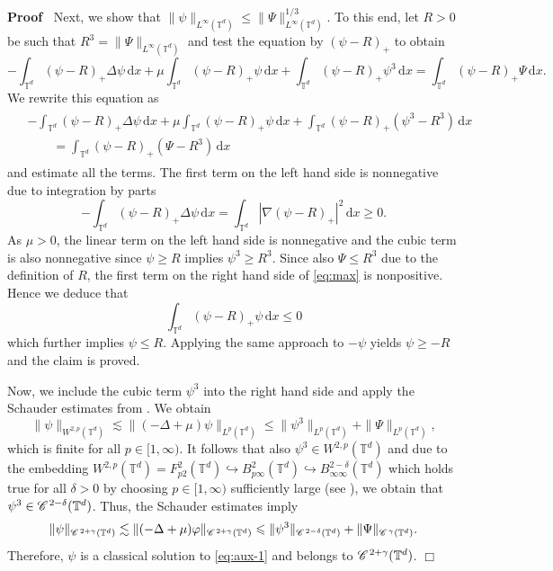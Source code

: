 \documentclass[a4paper,11pt]{article}
\renewcommand{\geq}{\geqslant}
\newenvironment{proof}{\noindent\textbf{Proof\ }}{\hspace*{\fill}$\Box$\medskip}
\numberwithin{equation}{section}
\newcommand{\CC}{\mathscr{C} \hspace{.1em}}
\newcommand{\8}{\infty}
\newcommand{\dd}{\mathrm{d}}
\begin{document}
\begin{proof}
Next, we show that  $\|\psi\|_{L^{\infty}(\mathbb{T}^{d})}\leqslant \|\Psi\|^{1/3}_{L^{\infty}(\mathbb{T}^{d})}$. To this end, let $R>0$ be such that $R^{3}=\| \Psi \|_{L^{\infty}(\mathbb{T}^{d})}$ and test the equation by $(\psi-R)_{+}$ to obtain
$$
- \int_{\mathbb{T}^{d}} (\psi-{R})_{+} \Delta\psi \,\dd x+ \mu\int_{\mathbb{T}^{d}} (\psi-R)_{+}\psi \,\dd x +\int_{\mathbb{T}^{d}} (\psi-R)_{+}\psi^{3}\,\dd x=\int_{\mathbb{T}^{d}} (\psi-R)_{+}\Psi\,\dd x.
$$
We rewrite this equation as
\begin{align}\label{eq:max}
\begin{aligned}
&- \int_{\mathbb{T}^{d}} (\psi-{R})_{+} \Delta\psi \,\dd x+ \mu\int_{\mathbb{T}^{d}} (\psi-R)_{+}\psi\,\dd x +\int_{\mathbb{T}^{d}} (\psi-R)_{+}(\psi^{3}-R^{3})\,\dd x\\
&\qquad =\int_{\mathbb{T}^{d}} (\psi-R)_{+}(\Psi -R^{3})\,\dd x
\end{aligned}
\end{align}
and estimate all the terms. The first term on the left hand side is nonnegative due to integration by parts
$$
- \int_{\mathbb{T}^{d}} (\psi-{R})_{+} \Delta\psi\,\dd x=\int_{\mathbb{T}^{d}} |\nabla (\psi-{R})_{+}|^{2}\,\dd x\geq 0 .
$$
As $\mu>0$, the linear term on the left hand side is nonnegative and the cubic term is also nonnegative since $\psi\geq R$ implies $\psi^{3}\geq R^{3}$.
Since also $\Psi\leqslant R^{3}$ due to the definition of $R$, the first term on the right hand side  of \eqref{eq:max} is nonpositive.
Hence we deduce that
$$
 \int_{\mathbb{T}^{d}} (\psi-{R})_{+}\psi \,\dd x\leqslant 0
$$
which further implies  $\psi\leqslant R$.
Applying the same approach to $-\psi$ yields $\psi\geq -R$ and the claim is proved.



Now, we include the cubic term $\psi^3$ into the right hand side and apply the Schauder estimates from \cite[(1.7)]{T06}. We obtain
$$
\|\psi\|_{W^{2,p}(\mathbb{T}^{d})}\lesssim \|(-\Delta+\mu)\psi\|_{L^{p}(\mathbb{T}^{d})} \leqslant \|\psi^3\|_{L^{p}(\mathbb{T}^{d})} +  \|\Psi\|_{L^{p}(\mathbb{T}^{d})},
$$
which is finite for all $p\in[1,\infty)$.  It follows that also  $\psi^3\in W^{2,p}(\mathbb{T}^{d})$ and due to the embedding $W^{2,p}(\mathbb{T}^{d})=F^{2}_{p2}(\mathbb{T}^{d})\hookrightarrow B^{2}_{p\infty}(\mathbb{T}^{d})\hookrightarrow B^{2-\delta}_{\infty\infty}(\mathbb{T}^{d})$ which holds true for all $\delta>0$ by choosing $p\in [1,\infty)$ sufficiently large   (see \cite[(1.3), (1.299), (1.305)]{T06}), we obtain that   $\psi^3\in \CC^{2-\delta}(\mathbb{T}^{d})$.
Thus,  the Schauder estimates \cite[(1.6)]{T06}  imply
$$
\|\psi\|_{\CC^{2+\gamma}(\mathbb{T}^{d})}\lesssim \|(-\Delta+\mu)\varphi\|_{\CC^{2+\gamma}(\mathbb{T}^{d})} \leqslant \|\psi^3\|_{\CC^{2-\delta}(\mathbb{T}^{d})} +  \|\Psi\|_{\CC^{\gamma}(\mathbb{T}^{d})}.
$$
Therefore, $\psi$ is a classical solution to   \eqref{eq:aux-1} and belongs to  $\CC^{2+\gamma}(\mathbb{T}^{d})$.
\end{proof}
\end{document}
